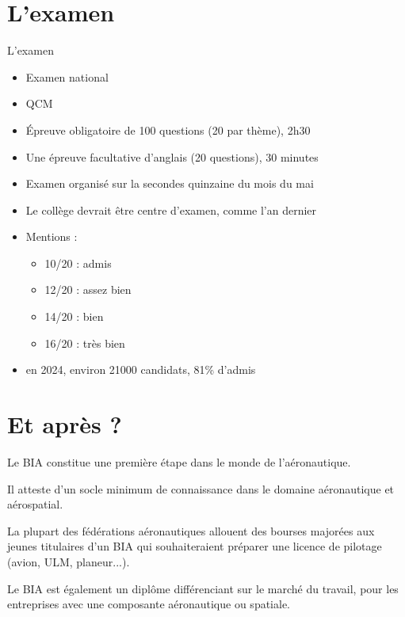 \section{L'examen}
\begin{frame}{L'examen}
\begin{itemize}
	\item Examen national
	\item QCM
	\item Épreuve obligatoire de 100 questions (20 par thème), 2h30
	\item Une épreuve facultative d'anglais (20 questions), 30 minutes
	\item Examen organisé sur la secondes quinzaine du mois du mai
	\item Le collège devrait être centre d'examen, comme l'an dernier
	\item Mentions :
	\begin{itemize}
		\item 10/20 : admis
		\item 12/20 : assez bien
		\item 14/20 : bien
		\item 16/20 : très bien
	\end{itemize}
	\item en 2024, environ 21000 candidats, 81\% d'admis
\end{itemize}
\end{frame}

\section{Et après ?}
\begin{frame}
Le BIA constitue une première étape dans le monde de l'aéronautique. 

Il atteste d'un socle minimum de connaissance dans le domaine aéronautique et aérospatial. 

La plupart des fédérations aéronautiques allouent des bourses majorées aux jeunes titulaires d'un BIA qui souhaiteraient préparer une licence de pilotage (avion, ULM, planeur...).

Le BIA est également un diplôme différenciant sur le marché du travail, pour les entreprises avec une composante aéronautique ou spatiale.
\end{frame}



